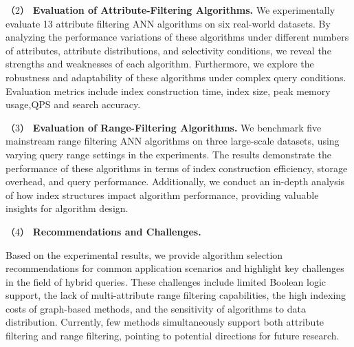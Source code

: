 \documentclass[sigconf, nonacm]{acmart}
\begin{document}
\begin{sloppypar}
（2）\textbf{ Evaluation of Attribute-Filtering Algorithms.}
We experimentally evaluate 13 attribute filtering ANN algorithms on six real-world datasets. By analyzing the performance variations of these algorithms under different numbers of attributes, attribute distributions, and selectivity conditions, we reveal the strengths and weaknesses of each algorithm. Furthermore, we explore the robustness and adaptability of these algorithms under complex query conditions. Evaluation metrics include index construction time, index size, peak memory usage,QPS and search accuracy.

（3）\textbf{ Evaluation of Range-Filtering Algorithms.}
We benchmark five mainstream range filtering ANN algorithms on three large-scale datasets, using varying query range settings in the experiments. The results demonstrate the performance of these algorithms in terms of index construction efficiency, storage overhead, and query performance. Additionally, we conduct an in-depth analysis of how index structures impact algorithm performance, providing valuable insights for algorithm design.

（4）\textbf{ Recommendations and Challenges.}

Based on the experimental results, we provide algorithm selection recommendations for common application scenarios and highlight key challenges in the field of hybrid queries. These challenges include limited Boolean logic support, the lack of multi-attribute range filtering capabilities, the high indexing costs of graph-based methods, and the sensitivity of algorithms to data distribution. Currently, few methods simultaneously support both attribute filtering and range filtering, pointing to potential directions for future research.


\end{sloppypar}
\end{document}
